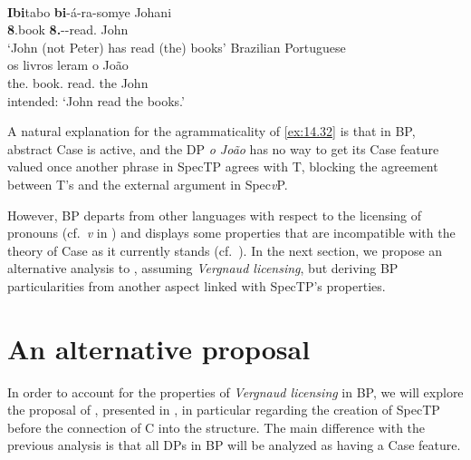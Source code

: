 \documentclass[output=paper]{langsci/langscibook}
\begin{document}
\ea%
    \label{ex:14.31} \parencite[723]{Carstens2011}\\
    \gll    \textbf{Ibi}tabo \textbf{bi}-á-ra-somye Johani\\
            \textbf{8}.book \textbf{8.\Sm}-\Pst{}-read.\Pfv{} John\\
    \glt    ‘John (not Peter) has read (the) books’
\ex\label{ex:14.32}Brazilian Portuguese\\
    \gll    \llap{*}os livros leram o João\\
            the.\Pl{} book.\Pl{} read.\Tpl{} the John\\
    \glt    intended: \enquote*{John read the books.}
\z

A natural explanation for the agrammaticality of \eqref{ex:14.32} is that
in \gls{BP}, abstract Case is active, and the DP \emph{o João} has no way to
get its Case feature valued once another phrase in SpecTP agrees with T,
blocking the agreement between T’s  and the external argument in
Spec\emph{v}P.

However, \gls{BP} departs from other  languages with respect to the
licensing of pronouns (cf.\ \emph{v} in ) and displays some
properties that are incompatible with the theory of Case as it currently stands
(cf.\ ). In the next section, we propose an
alternative analysis to \textcite{AvelarGalves2011,AvelarGalves2016}, assuming
\emph{Vergnaud licensing}, but deriving \gls{BP} particularities from another
aspect linked with SpecTP’s properties.

\section{An alternative proposal}\label{sec:14.5}

In order to account for the properties of \emph{Vergnaud licensing} in
\gls{BP}, we will explore the proposal of
\textcite{AvelarGalves2011,AvelarGalves2016}, presented in
, in particular regarding the creation of SpecTP before
the connection of C into the structure. The main difference with the previous
analysis is that all DPs in \gls{BP} will be analyzed as having a Case
feature.
\end{document}
